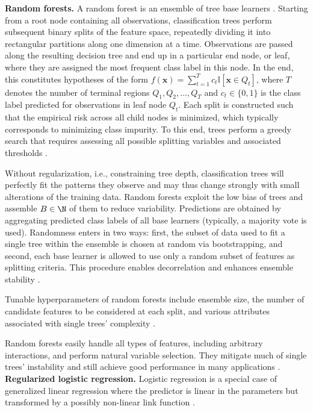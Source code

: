 \textbf{Random forests.}
A random forest is an ensemble of tree base learners \citep{louppe2014}.
Starting from a root node containing all observations, classification trees 
perform subsequent binary splits of the feature space, repeatedly dividing it 
into rectangular partitions along one dimension at a time.
Observations are passed along the resulting decision tree and end up in a 
particular end node, or leaf, where they are assigned the most frequent 
class label in this node.
In the end, this constitutes hypotheses of the form 
$f(\bm{x}) = \sum_{t = 1}^T c_t \mathbb{I}[\bm{x} \in Q_t]$, where $T$ denotes 
the number of terminal regions $Q_1, Q_2, \dots, Q_T$ and 
$c_t \in \{0, 1\}$ is the class label predicted for observations in leaf node 
$Q_t$.
Each split is constructed such that the empirical risk across all child nodes 
is minimized, which typically corresponds to minimizing class impurity.
To this end, trees perform a greedy search that requires assessing all 
possible splitting variables and associated thresholds
\citep{breimanetal1984}.

Without regularization, i.e., constraining tree depth, classification trees 
will perfectly fit the patterns they observe and may thus change strongly with 
small alterations of the training data.
Random forests exploit the low bias of trees and assemble $B \in \N$ of them to 
reduce variability.
Predictions are obtained by aggregating predicted class labels of all base 
learners (typically, a majority vote is used).
Randomness enters in two ways: first, the subset of data used to fit a single 
tree within the ensemble is chosen at random via bootstrapping, and second, each 
base learner is allowed to use only a random subset of features as splitting 
criteria.
This procedure enables decorrelation and enhances ensemble stability 
\citep{louppe2014}.

Tunable hyperparameters of random forests include ensemble size, the number of 
candidate features to be considered at each split, and various attributes 
associated with single trees' complexity \citep{probstetal2019}.

Random forests easily handle all types of features, including arbitrary 
interactions, and perform natural variable selection.
They mitigate much of single trees' instability and still achieve good 
performance in many applications \citep{louppe2014}.
\\

\textbf{Regularized logistic regression.}
Logistic regression is a special case of generalized linear regression where 
the predictor is linear in the parameters but transformed by a 
possibly non-linear link function \citep{lindsey1997}.


